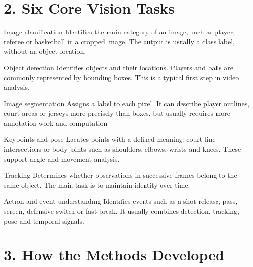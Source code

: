 \documentclass[11pt,a4paper,oneside]{report}
\begin{document}
\section*{2. Six Core Vision Tasks}

\begin{tcbraster}[raster columns=2,raster equal height=rows,raster column skip=7pt,raster row skip=7pt]
\begin{termBox}{Image classification}
Identifies the main category of an image, such as player, referee or basketball in a cropped image. The output is usually a class label, without an object location.
\end{termBox}
\begin{termBox}{Object detection}
Identifies objects and their locations. Players and balls are commonly represented by bounding boxes. This is a typical first step in video analysis.
\end{termBox}
\begin{termBox}{Image segmentation}
Assigns a label to each pixel. It can describe player outlines, court areas or jerseys more precisely than boxes, but usually requires more annotation work and computation.
\end{termBox}
\begin{termBox}{Keypoints and pose}
Locates points with a defined meaning: court-line intersections or body joints such as shoulders, elbows, wrists and knees. These support angle and movement analysis.
\end{termBox}
\begin{termBox}{Tracking}
Determines whether observations in successive frames belong to the same object. The main task is to maintain identity over time.
\end{termBox}
\begin{termBox}{Action and event understanding}
Identifies events such as a shot release, pass, screen, defensive switch or fast break. It usually combines detection, tracking, pose and temporal signals.
\end{termBox}
\end{tcbraster}

\section*{3. How the Methods Developed}
\end{document}
